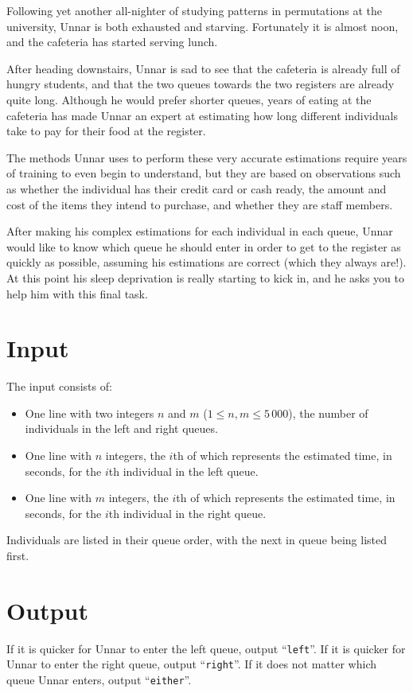 
%
Following yet another all-nighter of studying patterns in permutations at the
university, Unnar is both exhausted and starving. Fortunately it is almost
noon, and the cafeteria has started serving lunch.

After heading downstairs, Unnar is sad to see that the cafeteria is already
full of hungry students, and that the two queues towards the two registers are
already quite long. Although he would prefer shorter queues, years of eating at
the cafeteria has made Unnar an expert at estimating how long different
individuals take to pay for their food at the register.

The methods Unnar uses to perform these very accurate estimations require years
of training to even begin to understand, but they are based on observations
such as whether the individual has their credit card or cash ready, the amount and
cost of the items they intend to purchase, and whether they are staff members.

After making his complex estimations for each individual in each queue, Unnar
would like to know which queue he should enter in order to get to the register
as quickly as possible, assuming his estimations are correct (which they always
are!). At this point his sleep deprivation is really starting to kick in, and
he asks you to help him with this final task.

\section*{Input}
The input consists of:
\begin{itemize}
    \item One line with two integers $n$ and $m$ ($1 \le n,m \le 5\,000$), the number
    of individuals in the left and right queues.
    \item One line with $n$ integers, the $i$th of which represents the
    estimated time, in seconds, for the $i$th individual in the left queue.
    \item One line with $m$ integers, the $i$th of which represents the
    estimated time, in seconds, for the $i$th individual in the right queue.
\end{itemize}

Individuals are listed in their queue order, with the next in queue being
listed first.

\section*{Output}
If it is quicker for Unnar to enter the left queue, output ``\texttt{left}''.
If it is quicker for Unnar to enter the right queue, output ``\texttt{right}''.
If it does not matter which queue Unnar enters, output ``\texttt{either}''.

